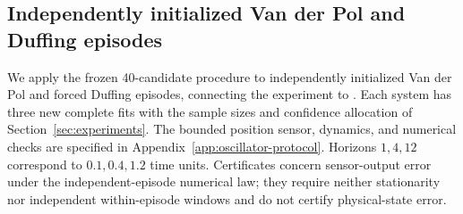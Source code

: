 \subsection{Independently initialized Van der Pol and Duffing episodes}
\label{sec:oscillators}

We apply the frozen 40-candidate procedure to independently initialized
Van der Pol and forced Duffing episodes, connecting the experiment to
\citet{kumar2026limits}. Each system has three new complete fits with the
sample sizes and confidence allocation of Section~\ref{sec:experiments}.
The bounded position sensor, dynamics, and numerical checks are specified in
Appendix~\ref{app:oscillator-protocol}. Horizons $1,4,12$ correspond to
$0.1,0.4,1.2$ time units. Certificates concern sensor-output error under the
independent-episode numerical law; they require neither stationarity nor
independent within-episode windows and do not certify physical-state error.

